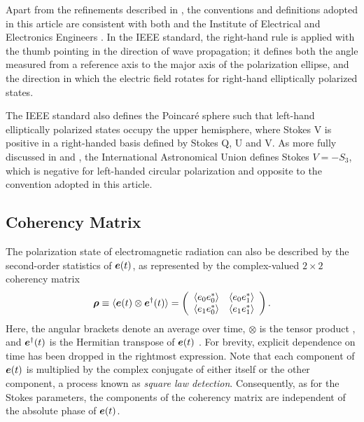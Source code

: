 Apart from the refinements described in , the conventions and definitions adopted in this article are consistent with both \cite{sto52} and the Institute of Electrical and Electronics Engineers \citep{ieee145}.
%
In the IEEE standard, the right-hand rule is applied with the thumb pointing in the direction of wave propagation; it defines both the angle measured from a reference axis to the major axis of the polarization ellipse, and the direction in which the electric field rotates for right-hand elliptically polarized states.

The IEEE standard also defines the Poincar\'{e} sphere such that left-hand elliptically polarized states occupy the upper hemisphere, where Stokes V is positive in a right-handed basis defined by Stokes Q, U and V.
%
As more fully discussed in \citet{hb96} and \citet{vmjr10}, the International Astronomical Union \citep{iau74} defines Stokes $V=-S_3$, which is negative for left-handed circular polarization and opposite to the convention adopted in this article.

%
%

\subsection{Coherency Matrix}
\label{sec:coherency_matrix}

%
The polarization state of electromagnetic radiation can also be described by the second-order statistics of $\mbox{\boldmath $e$}(t)$, as represented by the complex-valued
$2\times2$ coherency matrix \citep{bw80}
\begin{equation}
  \label{eqn:coherency}
  \mbox{\boldmath $\rho$}\equiv\langle\mbox{\boldmath $e$}(t) \otimes \mbox{\boldmath $e$}^\dagger(t) \rangle
=\left( 
    \begin{array}{cc}
    \langle e_0 e_0^* \rangle & \langle e_0 e_1^* \rangle \\
     \langle e_1 e_0^* \rangle & \langle e_1 e_1^* \rangle
    \end{array}
\right).
\end{equation}
Here, the angular brackets denote an average over time, $\otimes$
is the tensor product , and $\mbox{\boldmath $e$}^\dagger(t)$ is the Hermitian transpose
of $\mbox{\boldmath $e$}(t)$ .  For brevity, explicit dependence on time has been dropped
in the rightmost expression.  Note that each component of $\mbox{\boldmath $e$}(t)$ is multiplied 
by the complex conjugate of either itself or the other component,
a process known as \emph{square law detection}.
Consequently, as for the Stokes parameters,
the components of the coherency matrix are independent of the absolute phase of $\mbox{\boldmath $e$}(t)$.

